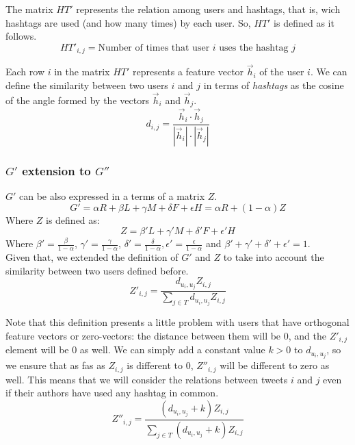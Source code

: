 \documentclass[12pt,a4paper]{article}
\begin{document}
The matrix $HT'$ represents the relation among users and hashtags, that is, wich hashtags are used (and how many times) by each user. So, $HT'$ is defined as it follows.
\begin{equation}
HT'_{i,j} = \text{Number of times that user } i \text{ uses the hashtag } j
\end{equation}

Each row $i$ in the matrix $HT'$ represents a feature vector $\vec{h}_i$ of the user $i$. We can define the similarity between two users $i$ and $j$ in terms of \emph{hashtags} as the cosine of the angle formed by the vectors $\vec{h}_i$ and $\vec{h}_j$.
\begin{equation}
d_{i,j} = \frac{\vec{h}_i \cdot \vec{h}_j}{ |\vec{h}_i| \cdot |\vec{h}_j|}
\end{equation}

\subsubsection*{$G'$ extension to $G''$}
$G'$ can be also expressed in a terms of a matrix $Z$.
\begin{equation}
G' = \alpha R + \beta L + \gamma M + \delta F + \epsilon H =   \alpha R + (1-\alpha) Z
\end{equation}
Where $Z$ is defined as:
\begin{equation}
Z = \beta' L + \gamma' M + \delta' F + \epsilon' H 
\end{equation}
Where $\beta' = \frac{\beta}{1-\alpha}$, $\gamma' = \frac{\gamma}{1-\alpha}$, $\delta' = \frac{\delta}{1-\alpha}, \epsilon' = \frac{\epsilon}{1 - \alpha}$ and $\beta' + \gamma' + \delta' + \epsilon'= 1$. \\

Given that, we extended the definition of $G'$ and $Z$ to take into account the similarity between two users defined before. 
\begin{equation}
Z'_{i,j} = \frac{d_{u_i,u_j} Z_{i,j}}{\sum_{j \in T}{d_{u_i,u_j} Z_{i,j}}}
\end{equation}

Note that this definition presents a little problem with users that have orthogonal feature vectors or zero-vectors: the distance between them will be 0, and the $Z'_{i,j}$ element will be 0 as well. We can simply add a constant value $k > 0$ to $d_{u_i,u_j}$, so we ensure that as fas as $Z_{i,j}$ is different to 0, $Z''_{i,j}$ will be different to zero as well. This means that we will consider the relations between tweets $i$ and $j$ even if their authors have used any hashtag in common.
\begin{equation}
Z''_{i,j} = \frac{ (d_{u_i,u_j} + k) Z_{i,j}}{\sum_{j \in T}{(d_{u_i,u_j} + k) Z_{i,j}}}
\end{equation}
\end{document}
